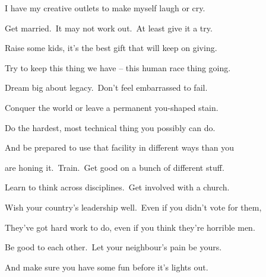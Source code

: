 I have my creative outlets to make myself laugh or cry.

Get married.\ It may not work out.\ At least give it a try.

Raise some kids, it's the best gift that will keep on giving.

Try to keep this thing we have -- this human race thing going.

Dream big about legacy.\ Don't feel embarrassed to fail.

Conquer the world or leave a permanent you-shaped stain.

Do the hardest, most technical thing you possibly can do.

And be prepared to use that facility in different ways than you

are honing it.\ Train.\ Get good on a bunch of different stuff.

Learn to think across disciplines.\ Get involved with a church.

Wish your country's leadership well.\ Even if you didn't vote for them,

They've got hard work to do, even if you think they're horrible men.

Be good to each other.\ Let your neighbour's pain be yours.

And make sure you have some fun before it's lights out.